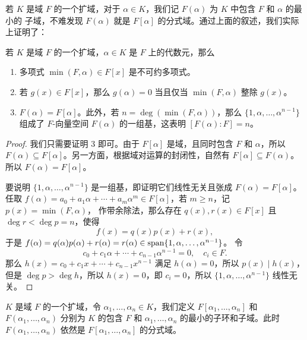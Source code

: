若 $K$ 是域 $F$ 的一个扩域，对于 $\alpha\in K$，我们记 $F(\alpha)$ 为 $K$ 中包含 $F$ 和 $\alpha$ 的最小的
子域，不难发现 $F(\alpha)$ 就是 $F[\alpha]$ 的分式域。通过上面的叙述，我们实际上证明了：
\begin{proposition}\label{prop:property of algebraic element}
  若 $K$ 是域 $F$ 的一个扩域，$\alpha\in K$ 是 $F$ 上的代数元，那么
  \begin{enumerate}
    \item 多项式 $\min(F,\alpha)\in F[x]$ 是不可约多项式。
    \item 若 $g(x)\in F[x]$，那么 $g(\alpha)=0$ 当且仅当 $\min(F,\alpha)$ 整除 $g(x)$。
    \item $F(\alpha)=F[\alpha]$。此外，若 $n=\deg(\min(F,\alpha))$，那么 $\{1,\alpha,\dots,\alpha^{n-1}\}$
    组成了 $F$-向量空间 $F(\alpha)$ 的一组基，这表明 $[F(\alpha):F]=n$。
  \end{enumerate}
\end{proposition}
\begin{proof}
  我们只需要证明 3 即可。由于 $F[\alpha]$ 是域，且同时包含 $F$ 和 $\alpha$，所以
   $F(\alpha)\subseteq F[\alpha]$。另一方面，根据域对运算的封闭性，自然有 $F[\alpha]\subseteq F(\alpha)$。
  所以 $F(\alpha)=F[\alpha]$。

  要说明 $\{1,\alpha,\dots,\alpha^{n-1}\}$ 是一组基，即证明它们线性无关且张成 $F(\alpha)=F[\alpha]$。任取
  $f(\alpha)= a_0+a_1\alpha+\cdots +a_m\alpha^m \in F[\alpha]$，若 $m\geq n$，记 $p(x)=\min(F,\alpha)$，
  作带余除法，那么存在 $q(x),r(x)\in F[x]$ 且 $\deg r<\deg p=n$，使得
  \[
    f(x)=q(x)p(x)  +r(x),
  \]
  于是 $f(\alpha)=q(\alpha)p(\alpha)+r(\alpha)=r(\alpha)\in \operatorname{span}\{1,\alpha,\dots,\alpha^{n-1}\}$。
  令
  \[
    c_0+c_1\alpha+\cdots+c_{n-1}\alpha^{n-1}=0,\quad c_i\in F.
  \]
  那么 $h(x)=c_0+c_1x+\cdots +c_{n-1}x^{n-1}$ 满足 $h(\alpha)=0$，所以 $p(x) \mid h(x)$，但是
  $\deg p>\deg h$，所以 $h(x)=0$，即 $c_i=0$，所以 $\{1,\alpha,\dots,\alpha^{n-1}\}$ 线性无关。
\end{proof}

$K$ 是域 $F$ 的一个扩域，令 $\alpha_1,\dots,\alpha_n\in K$，我们定义
$F[\alpha_1,\dots,\alpha_n]$ 和 $F(\alpha_1,\dots,\alpha_n)$ 分别为 $K$ 的包含
$F$ 和 $\alpha_1,\dots,\alpha_n$ 的最小的子环和子域。此时 $F(\alpha_1,\dots,\alpha_n)$
依然是 $F[\alpha_1,\dots,\alpha_n]$ 的分式域。

